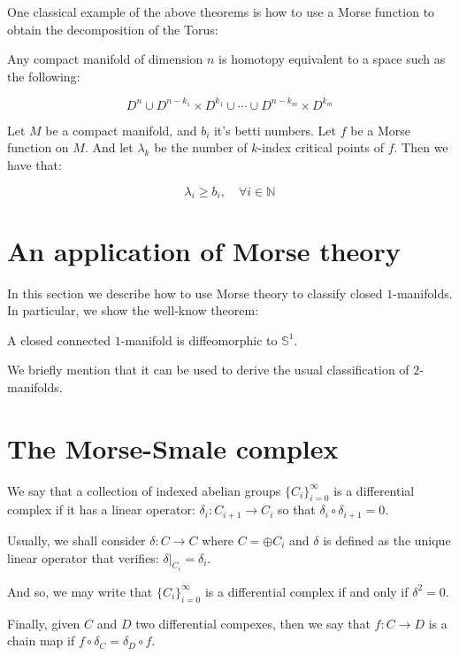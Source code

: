 \begin{example}
One classical example of the above theorems is how to use
a Morse function to obtain the decomposition of the Torus:
\end{example}

\begin{corollary}
\cite{sma1961}
Any compact manifold 
of dimension $n$
is homotopy equivalent to a space such as the following:

$$
D^n\cup
D^{n-k_1}\times D^{k_1}
\cup
\cdots
\cup
D^{n-k_m}\times D^{k_m}
$$
\end{corollary}


\begin{theorem}
Let $M$ be a compact manifold, and $b_i$ it's betti numbers.
Let $f$ be a Morse function on $M$. And let $\lambda_k$ be the 
number of $k$-index critical points of $f$. Then we have that:

$$
\lambda_i\geq b_i,\quad
\forall i\in\mathbb{N}
$$

\end{theorem}

\section{An application of Morse theory}

In this section we describe how to use Morse theory to classify closed $1$-manifolds.
In particular, we show the well-know theorem:

\begin{theorem}
A closed connected $1$-manifold is diffeomorphic to $\mathbb{S}^1$.
\end{theorem}

We briefly mention that it can be used to derive the usual classification of $2$-manifolds.





\section{The Morse-Smale complex}

\begin{definition}
We say that a collection of indexed abelian groups
$\{C_i\}_{i=0}^{\infty}$ is a differential complex if
it has a linear operator:
$\delta_i: C_{i+1}\to C_i$
so that $\delta_i\circ\delta_{i+1}=0$.

Usually, we shall consider $\delta: C\to C$ where $C=\oplus C_i$
and $\delta$ is defined as the unique linear operator 
that verifies: $\delta\vert_{C_i}=\delta_i$.

And so, we may write that $\{C_i\}_{i=0}^{\infty}$ 
is a differential complex if and only if $\delta^2=0$.

Finally, given $C$ and $D$ two differential compexes,
then we say that $f:C\to D$
is a chain map if $f\circ\delta_C=\delta_D\circ f$.

\end{definition}


